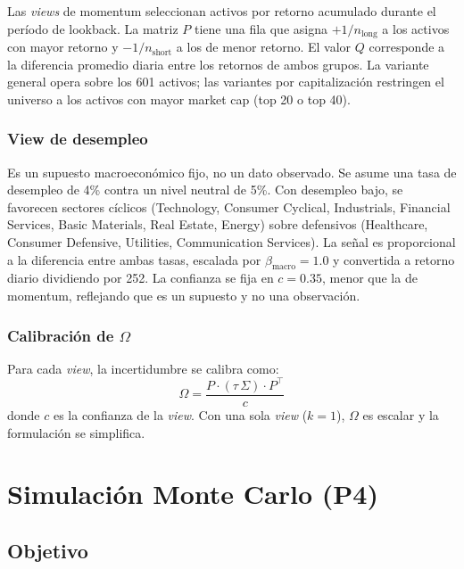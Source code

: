 Las \textit{views} de momentum seleccionan activos por retorno acumulado
durante el per\'iodo de lookback. La matriz $P$ tiene una fila que asigna
$+1/n_{\text{long}}$ a los activos con mayor retorno y
$-1/n_{\text{short}}$ a los de menor retorno. El valor $Q$ corresponde a la
diferencia promedio diaria entre los retornos de ambos grupos. La variante
general opera sobre los 601 activos; las variantes por capitalizaci\'on
restringen el universo a los activos con mayor market cap (top 20 o top 40).

\subsubsection{View de desempleo}

Es un supuesto macroecon\'omico fijo, no un dato observado. Se asume una
tasa de desempleo de 4\% contra un nivel neutral de 5\%. Con desempleo bajo,
se favorecen sectores c\'iclicos (Technology, Consumer Cyclical, Industrials,
Financial Services, Basic Materials, Real Estate, Energy) sobre defensivos
(Healthcare, Consumer Defensive, Utilities, Communication Services). La
se\~nal es proporcional a la diferencia entre ambas tasas, escalada por
$\beta_{\text{macro}} = 1.0$ y convertida a retorno diario dividiendo por
252. La confianza se fija en $c = 0.35$, menor que la de momentum, reflejando
que es un supuesto y no una observaci\'on.

\subsubsection{Calibraci\'on de $\Omega$}

Para cada \textit{view}, la incertidumbre se calibra como:
\begin{equation}
\Omega = \frac{P \cdot (\tau\,\Sigma) \cdot P^\top}{c}
\end{equation}
donde $c$ es la confianza de la \textit{view}. Con una sola \textit{view}
($k=1$), $\Omega$ es escalar y la formulaci\'on se simplifica.

\section{Simulaci\'on Monte Carlo (P4)}

\subsection{Objetivo}

